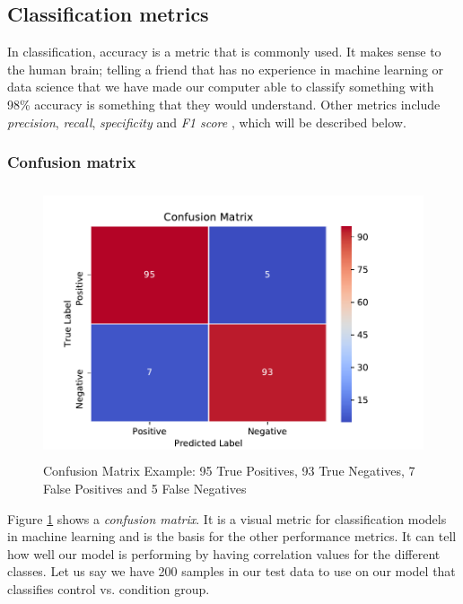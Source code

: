 \subsection{Classification metrics}
In classification, accuracy is a metric that is commonly used. It makes sense to the human brain; telling a friend that has no experience in machine learning or data science that we have made our computer able to classify something with 98\% accuracy is something that they would understand. Other metrics include \textit{precision}, \textit{recall}, \textit{specificity} and \textit{F1 score} \cite{GarciaCeja2018_classification_bipolar}, which will be described below.

\subsubsection{Confusion matrix}

\begin{figure}[h]
  \begin{center}
    \includegraphics[height=8cm]{img/conf_matrix.pdf}
    \caption{Confusion Matrix Example: 95 True Positives, 93 True Negatives, 7 False Positives and 5 False Negatives}
    \label{figure:confusion_matrix_bipolar}
  \end{center}
\end{figure}

Figure \ref{figure:confusion_matrix_bipolar} shows a \textit{confusion matrix}. It is a visual metric for classification models in machine learning and is the basis for the other performance metrics. It can tell how well our model is performing by having correlation values for the different classes. Let us say we have 200 samples in our test data to use on our model that classifies control vs. condition group. 

